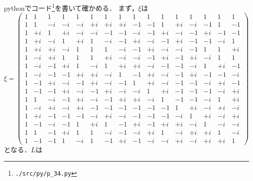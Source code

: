 pythonでコード\footnote{\verb|./src/py/p_34.py|}を書いて確かめる．
まず，$\xi$は
\[\xi =
\begin{pmatrix}
  1 & 1 & 1 & 1 & 1 & 1 & 1 & 1 & 1 & 1 & 1 & 1 & 1 & 1 & 1 & 1 \\
  1 & 1 &  - i &  - i &  - i &  + i &  + i &  + i &  - 1 &  - 1 & 1 &  + i &  - i &  - 1 & 1 &  - 1 \\
  1 &  + i & 1 &  + i &  - i &  - i &  - 1 &  - 1 &  - i &  - 1 &  + i &  - i &  - 1 &  + i &  - 1 &  - 1 \\
  1 &  + i &  - i & 1 &  + i & 1 &  - i &  - 1 &  + i &  - i &  - 1 &  + i &  - 1 &  - 1 &  - i & 1 \\
  1 &  + i &  + i &  - i & 1 & 1 & 1 &  - i &  - 1 &  + i &  - i &  - i &  - 1 & 1 & 1 &  + i \\
  1 &  - i &  + i & 1 & 1 & 1 &  + i &  - i &  - i &  - 1 &  + i &  - 1 &  + i &  - i & 1 & 1 \\
  1 &  - i &  - 1 &  + i & 1 &  - i & 1 &  + i &  + i &  - i &  - 1 &  - 1 &  - i & 1 &  + i &  - 1 \\
  1 &  - i &  - 1 &  - 1 &  + i &  + i &  - i & 1 &  - 1 &  + i &  - i &  - 1 &  + i &  - 1 &  - 1 &  - i \\
  1 &  - 1 &  + i &  - i &  - 1 &  + i &  - i &  - 1 & 1 &  + i &  - i &  - 1 &  - 1 &  - i &  + i &  - 1 \\
  1 &  - 1 &  - 1 &  + i &  - i &  - 1 &  + i &  - i &  - i & 1 &  + i &  - 1 &  - 1 &  - 1 &  - i &  + i \\
  1 & 1 &  - i &  - 1 &  + i &  - i &  - 1 &  + i &  + i &  - i & 1 &  - 1 &  - 1 &  - i & 1 &  + i \\
  1 &  - i &  + i &  - i &  + i &  - 1 &  - 1 &  - 1 &  - 1 &  - 1 &  - 1 & 1 &  + i &  - i &  + i &  - i \\
  1 &  + i &  - 1 &  - 1 &  - 1 &  - i &  + i &  - i &  - 1 &  - 1 &  - 1 &  - i & 1 &  + i &  - i &  + i \\
  1 &  - 1 &  - i &  - 1 & 1 &  + i & 1 &  - 1 &  + i &  - 1 &  + i &  + i &  - i & 1 &  - i &  - i \\
  1 & 1 &  - 1 &  + i & 1 & 1 &  - i &  - 1 &  - i &  + i & 1 &  - i &  + i &  + i & 1 &  - i \\
  1 &  - 1 &  - 1 & 1 &  - i & 1 &  - 1 &  + i &  - 1 &  - i &  - i &  + i &  - i &  + i &  + i & 1
\end{pmatrix}
\]
となる．$L$は
